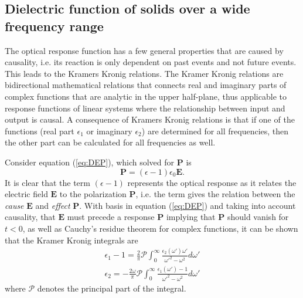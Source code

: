 \subsection{Dielectric function of solids over a wide frequency range}
The optical response function has a few general properties that are caused by causality, i.e. its reaction is only dependent on past events and not future events. This leads to the Kramers Kronig relations\cite{hans_arwin}. The Kramer Kronig relations are bidirectional mathematical relations that connects real and imaginary parts of complex functions that are analytic in the upper half-plane, thus applicable to response functions of linear systems where the relationship between input and output is causal\cite{mathmethodsforphysicists}. A consequence of Kramers Kronig relations is that if one of the functions (real part $\epsilon_1$ or imaginary $\epsilon_2$) are determined for all frequencies, then the other part can be calculated for all frequencies as well.

Consider equation (\ref{eq:DEP}), which solved for  $\mathbf{P}$ is
\begin{equation}
    \mathbf{P} = (\epsilon-1)\epsilon_0 \mathbf{E}.
\end{equation}
It is clear that the term $(\epsilon-1)$ represents the optical response as it relates the electric field $\mathbf{E}$ to the polarization $\mathbf{P}$, i.e. the term gives the relation between the \emph{cause} $\mathbf{E}$ and \emph{effect} $\mathbf{P}$. With basis in equation (\ref{eq:DEP}) and taking into account causality, that $\mathbf{E}$ must precede a response $\mathbf{P}$ implying that $\mathbf{P}$ should vanish for $t<0$, as well as Cauchy's residue theorem for complex functions, it can be shown that the Kramer Kronig integrals are \cite{web:dresselhaus}\cite{hans_arwin}
\begin{subequations}
    \begin{align}
        \epsilon_1 - 1 = \frac{2}{\pi}\mathscr{P}\int_0^\infty\frac{\epsilon_2(\omega')\omega'}{\omega'^2-\omega^2}d\omega'    \\
        \epsilon_2 = -\frac{2\omega}{\pi}\mathscr{P}\int_0^\infty\frac{\epsilon_1(\omega')-1}{\omega'^2-\omega^2}d\omega'
    \end{align}
    \label{eq:KramerKronig}
\end{subequations}
where $\mathscr{P}$ denotes the principal part of the integral.

